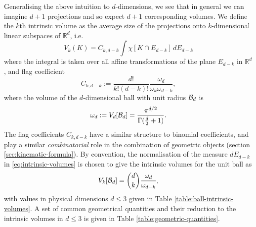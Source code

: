 Generalising the above intuition to $d$-dimensions, we see that in general we can imagine $d+1$ projections and so expect $d+1$ corresponding volumes.
We define the $k$th intrinsic volume as the average size of the projections onto $k$-dimensional linear subspaces of $\mathbb{R}^d$, i.e.\ \cite{Klain1997,Santalo2004}
\begin{equation}\label{eq:intrinsic-volumes}
  V_k(K)
  =
  C_{k,d-k}
  \int \chi[K \cap E_{d-k}] \, dE_{d-k}
\end{equation}
where the integral is taken over all affine transformations of the plane $E_{d-k}$ in $\mathbb{R}^d$, and flag coefficient
\begin{equation}\label{eq:flag-coefficients}
  C_{k,d-k}
  :=
  \frac{d!}{k! (d-k)!} \frac{\omega_d}{\omega_k \omega_{d-k}},
\end{equation}
where the volume of the $d$-dimensional ball with unit radius $\mathcal{B}_d$ is
\begin{equation}
  \omega_d := V_d[\mathcal{B}_d] = \frac{\pi^{d/2}}{\Gamma(\frac{d}{2} + 1)}.
\end{equation}
The flag coefficients $C_{k,d-k}$ have a similar structure to binomial coefficients, and play a similar \emph{combinatorial} role in the combination of geometric objects (section \ref{sec:kinematic-formula}).
By convention, the normalisation of the measure $dE_{d-k}$ in \eqref{eq:intrinsic-volumes} is chosen to give the intrinsic volumes for the unit ball as
\begin{equation}\label{eq:intrinsic-volume-ball}
  V_k [\mathcal{B}_d]
  =
  {d \choose k} \frac{\omega_d}{\omega_{d-k}},
\end{equation}
with values in physical dimensions $d \le 3$ given in Table \ref{table:ball-intrinsic-volumes}.
A set of common geometrical quantities and their reduction to the intrinsic volumes in $d \le 3$ is given in Table \ref{table:geometric-quantities}.

